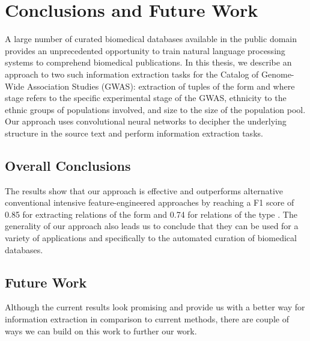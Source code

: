 
\chapter{Conclusions and Future Work}
\label{chapter:conclusion-and-future-work}
A large number of curated biomedical databases available in the public domain provides an unprecedented opportunity to train natural language processing systems to comprehend biomedical publications. In this thesis, we describe an approach to two such information extraction tasks for the Catalog of Genome-Wide Association Studies (GWAS): extraction of tuples of the form {\it <stage, ethnicity>} and {\it <stage, sample size>} where stage refers to the specific experimental stage of the GWAS, ethnicity to the ethnic groups of populations involved, and size to the size of the population pool. Our approach uses convolutional neural networks to decipher the underlying structure in the source text and perform information extraction tasks.

\section{Overall Conclusions}
\label{section:overall-conclusions}
The results show that our approach is effective and outperforms alternative conventional intensive feature-engineered approaches by reaching a F1 score of 0.85 for extracting relations of the form {\it <stage, ethnicity>} and 0.74 for relations of the type {\it <stage, size>}. The generality of our approach also leads us to conclude that they can be used for a variety of applications and specifically to the automated curation of biomedical databases.

\section{Future Work}
\label{section:future-work}
Although the current results look promising and provide us with a better way for information extraction in comparison to current methods, there are couple of ways we can build on this work to further our work.

